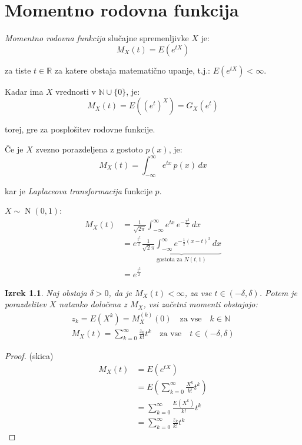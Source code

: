 \documentclass[12pt]{book}
\def\n{\noindent}
\theoremstyle{definition}
\theoremstyle{plain}
\newtheorem{izrek}{Izrek}
\theoremstyle{plain}
\theoremstyle{plain}
\theoremstyle{remark}
\begin{document}
\chapter{Momentno rodovna funkcija}

\n \emph{Momentno rodovna funkcija} slučajne spremenljivke $X$ je: 
$$
M_X(t)=E\left(e^{t  X}\right)
$$

za tiste $t \in \mathbb{R}$ za katere obstaja matematično upanje, t.j.: $E\left(e^{t X}\right)<\infty$.

\n Kadar ima $X$ vrednosti v $\mathbb{N} \cup \{0\}$, je: 
$$
M_X(t)=E\left(\left(e^t\right)^X\right)=G_X\left(e^t\right)
$$

torej, gre za posplošitev rodovne funkcije. 

\n Če je $X$ zvezno porazdeljena z gostoto $p(x)$, je: 
$$
M_X(t)=\int_{-\infty}^{\infty} e^{t  x} \, p(x) \, d x
$$

kar je \emph{Laplaceova transformacija} funkcije $p$. 

\begin{zgled}
    $X \sim \operatorname{N}(0,1)$:
    $$
    \begin{aligned}
        M_X(t)&=\frac{1}{\sqrt{2 \pi}} \int_{-\infty}^{\infty} e^{t x} \, e^{-\frac{x^2}{2}} \,d x \\
        &=e^{\frac{t^2}{2}} \underbrace{\frac{1}{\sqrt{2} \pi} \int_{-\infty}^{\infty} e^{-\frac{1}{2}(x-t)^2} \, d x}_{\text {gostota za } N(t, 1)} \\
        &=e^{\frac{t^2}{2}}
    \end{aligned}
    $$
\end{zgled}

\begin{izrek}
    Naj obstaja $\delta > 0$, da je $M_X(t)<\infty$, za vse $t \in(-\delta, \delta)$. Potem je porazdelitev $X$ natanko določena z $M_X$, vsi začetni momenti obstajajo: 
    $$
    \begin{aligned}
        & z_k=E\left(X^k\right)=M_X^{(k)}(0) \quad \text {za vse} \quad  k \in \mathbb{N} & \\
        & M_X(t)=\sum_{k=0}^{\infty} \frac{z_k}{k !} t^k \quad \text{za vse} \quad {t \in(-\delta, \delta)} &
    \end{aligned}
    $$
\end{izrek}

\begin{proof}(skica)
    $$
    \begin{aligned}
        M_X(t)&=E\left(e^{t X}\right) \\
        &=E\left(\sum_{k=0}^{\infty} \frac{X^k}{k !}  t^k\right) \\
        &=\sum_{k=0}^{\infty} \frac{E\left(X^k\right)}{k !} t^k \\
        &=\sum_{k=0}^{\infty} \frac{z_k}{k !} t^k
    \end{aligned}
    $$
\end{proof}
\end{document}
